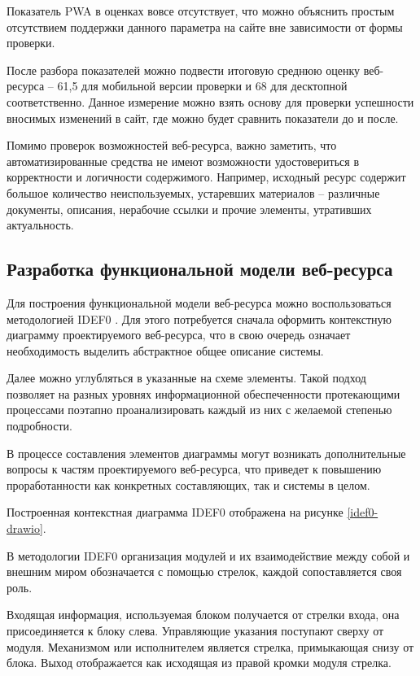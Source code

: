 Показатель PWA в оценках вовсе отсутствует, что можно объяснить простым отсутствием поддержки данного параметра на сайте вне зависимости от формы проверки.

После разбора показателей можно подвести итоговую среднюю оценку веб-ресурса -- 61,5 для мобильной версии проверки и 68 для десктопной соответственно.
Данное измерение можно взять основу для проверки успешности вносимых изменений в сайт, где можно будет сравнить показатели до и после.

Помимо проверок возможностей веб-ресурса, важно заметить, что автоматизированные средства не имеют возможности удостовериться в корректности и логичности содержимого.
Например, исходный ресурс содержит большое количество неиспользуемых, устаревших материалов -- различные документы, описания, нерабочие ссылки и прочие элементы, утративших актуальность.

\subsection{Разработка функциональной модели веб-ресурса}

Для построения функциональной модели веб-ресурса можно воспользоваться методологией IDEF0 \cite{wiki-idef0}.
Для этого потребуется сначала оформить контекстную диаграмму проектируемого веб-ресурса, что в свою очередь означает необходимость выделить абстрактное общее описание системы.

Далее можно углубляться в указанные на схеме элементы.
Такой подход позволяет на разных уровнях информационной обеспеченности протекающими процессами поэтапно проанализировать каждый из них с желаемой степенью подробности.

В процессе составления элементов диаграммы могут возникать дополнительные вопросы к частям проектируемого веб-ресурса, что приведет к повышению проработанности как конкретных составляющих, так и системы в целом.

Построенная контекстная диаграмма IDEF0 отображена на рисунке \ref{idef0-drawio}.

В методологии IDEF0 организация модулей и их взаимодействие между собой и внешним миром обозначается с помощью стрелок, каждой сопоставляется своя роль.

Входящая информация, используемая блоком получается от стрелки входа, она присоединяется к блоку слева.
Управляющие указания поступают сверху от модуля.
Механизмом или исполнителем является стрелка, примыкающая снизу от блока.
Выход отображается как исходящая из правой кромки модуля стрелка.

